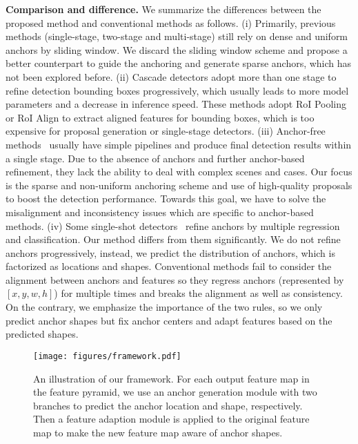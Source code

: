 \documentclass[10pt,twocolumn,letterpaper]{article}
\begin{document}
\noindent
\textbf{Comparison and difference.}
We summarize the differences between the proposed method and conventional methods as follows.
(i) Primarily, previous methods (single-stage, two-stage and multi-stage) still
rely on dense and uniform anchors by sliding window. We discard the sliding
window scheme and propose a better counterpart to guide the anchoring and
generate sparse anchors, which has not been explored before.
(ii) Cascade detectors adopt more than one stage to refine detection bounding
boxes progressively, which usually leads to more model parameters and a decrease in inference speed.
These methods adopt RoI Pooling or RoI Align to extract aligned features for bounding boxes,
which is too expensive for proposal generation or single-stage detectors.
(iii) Anchor-free methods~\cite{huang2015densebox,jie2016scale,redmon2016you}
usually have simple pipelines and produce final detection results within a single stage.
Due to the absence of anchors and further anchor-based refinement,
they lack the ability to deal with complex scenes and cases.
Our focus is the sparse and non-uniform anchoring scheme and use of high-quality
proposals to boost the detection performance.
Towards this goal, we have to solve the misalignment and inconsistency issues which are specific to anchor-based methods.
(iv) Some single-shot detectors~\cite{zhang2017single,wu2018singleshot} refine
anchors by multiple regression and classification.
Our method differs from them significantly.
We do not refine anchors progressively, instead, we predict the distribution of
anchors, which is factorized as locations and shapes.
Conventional methods fail to consider the alignment between anchors and features
so they regress anchors (represented by $[x,y,w,h]$) for multiple times and breaks the alignment as well as consistency.
On the contrary, we emphasize the importance of the two rules,
so we only predict anchor shapes but fix anchor centers and adapt features based on the predicted shapes.
 

\begin{figure*}[t]
	\centering
	\texttt{[image: figures/framework.pdf]}
	\caption{\small{An illustration of our framework. For each output feature map in the
		feature pyramid, we use an anchor generation module with two branches to
		predict the anchor location and shape, respectively. Then a feature
		adaption module is applied to the original feature map to make the
		new feature map aware of anchor shapes.}}
	\label{fig:framework}
	\vspace{-15pt}
\end{figure*}
\end{document}

